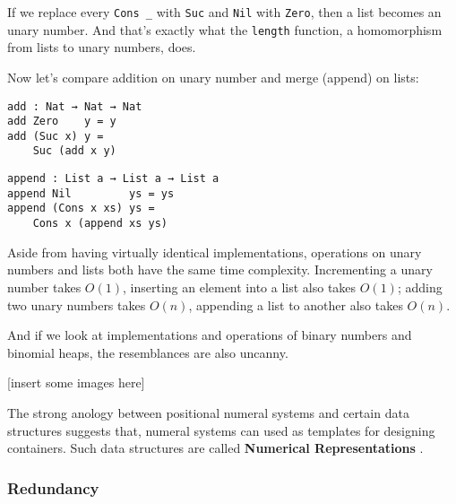 \documentclass[12pt, a4paper]{article}
\begin{document}
If we replace every {\lstinline|Cons _|} with {\lstinline|Suc|} and {\lstinline|Nil|}
with {\lstinline|Zero|}, then a list becomes an unary number.
And that's exactly what the {\lstinline|length|} function,
a homomorphism from lists to unary numbers, does.

Now let's compare addition on unary number and merge (append) on lists:

\noindent\begin{minipage}{.48\textwidth}
\begin{lstlisting}[basicstyle=\ttfamily\scriptsize]
add : Nat → Nat → Nat
add Zero    y = y
add (Suc x) y =
    Suc (add x y)
\end{lstlisting}
\end{minipage}\hfill
\begin{minipage}{.45\textwidth}
\begin{lstlisting}[basicstyle=\ttfamily\scriptsize]
append : List a → List a → List a
append Nil         ys = ys
append (Cons x xs) ys =
    Cons x (append xs ys)
\end{lstlisting}
\end{minipage}

Aside from having virtually identical implementations, operations on unary numbers
and lists both have the same time complexity. Incrementing a unary number takes
$ O(1) $, inserting an element into a list also takes $ O(1) $; adding two unary
numbers takes $ O(n) $, appending a list to another also takes $ O(n) $.

And if we look at implementations and operations of binary numbers and binomial
heaps, the resemblances are also uncanny.

[insert some images here]

The strong anology between positional numeral systems and certain data structures
suggests that, numeral systems can used as templates for designing containers.
Such data structures are called \textbf{Numerical Representations}\cite{okasaki1996purely}
\cite{hinze1998numerical}.



\subsubsection{Redundancy}
\end{document}
